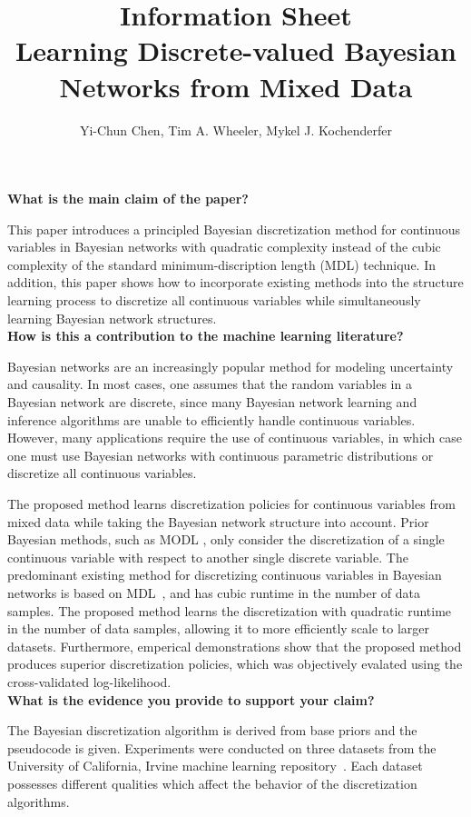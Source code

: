 \documentclass{article}
\title{Information Sheet \\ {\large Learning Discrete-valued Bayesian Networks from Mixed Data}}
\author{\normalsize Yi-Chun Chen, Tim A. Wheeler, Mykel J. Kochenderfer}
\date{}
\begin{document}
\maketitle

\noindent
\textbf{What is the main claim of the paper?}

This paper introduces a principled Bayesian discretization method for continuous variables in Bayesian networks with quadratic complexity instead of the cubic complexity of the standard minimum-discription length (MDL) technique.
In addition, this paper shows how to incorporate existing methods into the structure learning process to discretize all continuous variables while simultaneously learning Bayesian network structures.\\[0em]

\noindent
\textbf{How is this a contribution to the machine learning literature?}

Bayesian networks are an increasingly popular method for modeling uncertainty and causality.
In most cases, one assumes that the random variables in a Bayesian network are discrete, since many Bayesian network learning and inference algorithms are unable to efficiently handle continuous variables.
However, many applications require the use of continuous variables, in which case one must use Bayesian networks with continuous parametric distributions or discretize all continuous variables.

The proposed method learns discretization policies for continuous variables from mixed data while taking the Bayesian network structure into account.
Prior Bayesian methods, such as MODL \citep{Boulle_2006, Lustgarten_2011}, only consider the discretization of a single continuous variable with respect to another single discrete variable.
The predominant existing method for discretizing continuous variables in Bayesian networks is based on MDL~\citep{Friedman_1996}, and has cubic runtime in the number of data samples.
The proposed method learns the discretization with quadratic runtime in the number of data samples, allowing it to more efficiently scale to larger datasets.
Furthermore, emperical demonstrations show that the proposed method produces superior discretization policies, which was objectively evalated using the cross-validated log-likelihood.\\[0em]

\noindent
\textbf{What is the evidence you provide to support your claim?}

The Bayesian discretization algorithm is derived from base priors and the pseudocode is given.
Experiments were conducted on three datasets from the University of California, Irvine machine learning repository~\citep{Lichman_2013}.
Each dataset possesses different qualities which affect the behavior of the discretization algorithms.
\end{document}

